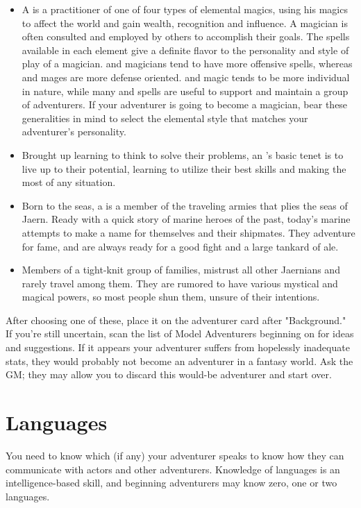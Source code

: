\begin{multicols*}{2}
\begin{itemize}[leftmargin=12pt]
\item A  is a practitioner of one of four types of elemental magics, using his magics to affect the world and gain wealth, recognition and influence. A magician is often consulted and employed by others to accomplish their goals.
The spells available in each element give a definite flavor to the personality and style of play of a magician.  and  magicians tend to have more offensive spells, whereas  and  mages are more defense oriented.  and  magic tends to be more individual in nature, while many  and  spells are useful to support and maintain a group of adventurers. If your adventurer is going to become a magician, bear these generalities in mind to select the elemental style that matches your adventurer's personality.

\item Brought up learning to think to solve their problems, an 's basic tenet is to live up to their potential, learning to utilize their best skills and making the most of any situation.
\item Born to the seas, a  is a member of the traveling armies that plies the seas of Jaern. Ready with a quick story of marine heroes of the past, today's marine attempts to make a name for themselves and their shipmates. They adventure for fame, and are always ready for a good fight and a large tankard of ale.

\item Members of a tight-knit group of families,  mistrust all other Jaernians and rarely travel among them. They are rumored to have various mystical and magical powers, so most people shun them, unsure of their intentions.
\end{itemize}
After choosing one of these, place it on the adventurer card after "Background." If you're still uncertain, scan the list of Model Adventurers beginning on  for ideas and suggestions. If it appears your adventurer suffers from hopelessly inadequate stats, they would probably not become an adventurer in a fantasy world. Ask the GM; they may allow you to discard this would-be adventurer and start over.
\section{Languages}
You need to know which  (if any) your adventurer speaks to know how they can communicate with actors and other adventurers. Knowledge of languages is an intelligence-based skill, and beginning adventurers may know zero, one or two languages.


\end{multicols*}
